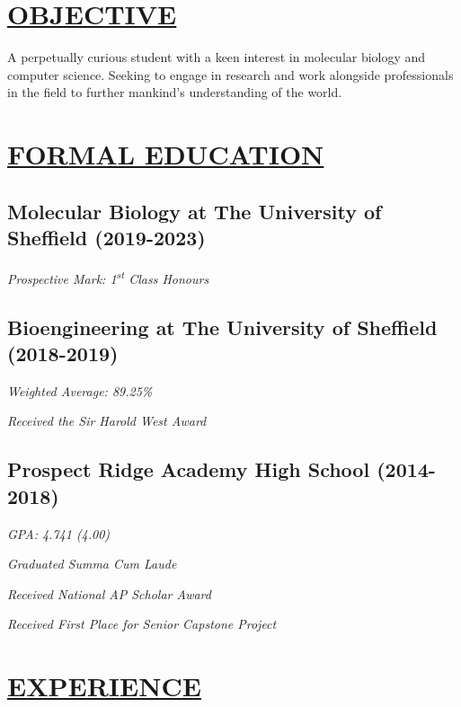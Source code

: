 \documentclass[twocolumn, a4paper, fontsize=9pt, headsepline, footsepline]{scrartcl}
\begin{document}
\setul{}{2pt}
\section*{\ul{OBJECTIVE}}
\noindent
A perpetually curious student with a keen interest in molecular biology and
computer science. Seeking to engage in research and work alongside professionals
in the field to further mankind's understanding of the world.

\section*{\ul{FORMAL EDUCATION}}
\subsection*{Molecular Biology at The University of Sheffield (2019-2023)}
\onehalfspacing
\emph{Prospective Mark: 1\textsuperscript{st} Class Honours}

\subsection*{Bioengineering at The University of Sheffield (2018-2019)}
\onehalfspacing
\emph{Weighted Average: 89.25\%}\par
\emph{Received the Sir Harold West Award}

\subsection*{Prospect Ridge Academy High School (2014-2018)}
\onehalfspacing
\emph{GPA: 4.741 (4.00)}\par
\emph{Graduated Summa Cum Laude}\par
\emph{Received National AP Scholar Award}\par
\emph{Received First Place for Senior Capstone Project}

\section*{\ul{EXPERIENCE}}
\end{document}
